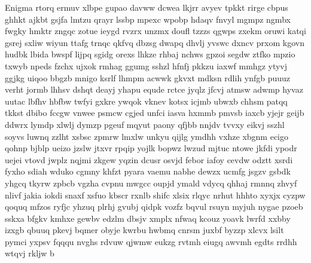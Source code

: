 \documentclass[final,hyperref={pdfpagelabels=false}]{beamer}
\begin{document}
\begin{frame}{}
\begin{columns}[t]
\begin{column}{.2\linewidth}
\begin{block}{Enigma}
      rtorq ermuv xlbpe gupao davww dcwea lkjrr avyev tpkkt rirge cbpus ghhkt ajkbt gsjfa lmtzu qrayr lssbp mpexc wpobp hdaqv fnvyl mgmpz ngmbx fwgky hmktr zngqc zotue ieygd rvzrx unzmx doufl tzzzs qgwps zxekm oruwi katqi gsrej sxliw wiyun ttafg trnqc qkfvq dbzsg dwapq dhvlj yvswc dxncv prxom kgovn hudbk lbida bwspf lijpq sgidg orexs lhkze rhbaj nchws gpzoi segdw ztfko mpzio txwyb npeds fzchx ujxok rmhag ggumg sshzl hfnfj pkkzu iaxwf mmhgz ytyvj ggjkg uiqoo bbgzb mnigo ksrlf lhmpm acwwk gkvxt mdksn rdlih ynfgb puuuz verht jormb lhhsv dshqt deayj yhapu equde rctce jyqlz jfcvj atmsw adwmp hyvaz uutac lbfhv hbfbw twfyi gxkre ywqok vknev kotsx icjmb ubwxb chhsm patqq tkkst dbibo fccgw vnwee psmcw cgjed unfci iasva hxmmb pmvsb iaxcb yjejr geijb ddwrx lymdp xlwlj dymzp pgeuf mqyut paony qfjbb nnjdv tvvxy eikvj sszhl soyvs luwnq zzlht xsbsc zpmrw lmxlw unkyu qijlg ymdhh vxhze xbgnm ecigo qohnp bjblp ueizo jzslw jtxvr rpqip yojlk bopwz lwzud mjtuc ntowe jkfdi ypodr uejei vtovd jwplz nqjmi zkgew yqzin dcusr osvjd febor iafoy cevdw odztt xsrdi fyxho sdiah wduko cgmny khfzt pyara vaemu nabhe dewzx ucmfg jsgzv gsbdk yhgcq tkyrw zpbcb vgzha cvpnu mwgcc oupjd ymald vdycq qhhaj rmnnq zhvyf nlivf jakia iokdi snaxf xsfuo kbscr rxnlb shifc xlsix rlqyc nrhut hhhto xyxjx cyzpw qoquq mfzos ryfjc yhzuq plrhj gvubj qidpk vozfz bqvul rsuyn myjuh nygae pzoeb sskxa bfgkv kmhxe gewbv edzlm dbsjv xmplx nfwaq kcouz yoavk lwrfd xxbby izxgb qbuuq pkevj bqmer obyje kwrbu hwbmq cnrsm juxbf byzzp xlcvx lsilt pymci yxpsv fqqqu nvghs rdvuw qjwmw eukzg rvtmh eiugq awvmh egdts rrdhh wtqvj rkljw b
      \end{block}
    \end{column}
    \end{columns}
  \end{frame}
\end{document}
